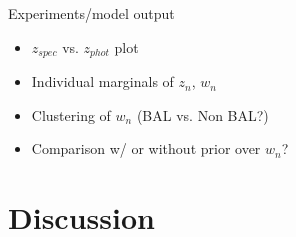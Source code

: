 \documentclass{article}
\begin{document}
Experiments/model output
\begin{itemize}
\item $z_{spec}$ vs. $z_{phot}$ plot 
\item Individual marginals of $z_n$, $w_n$
\item Clustering of $w_n$ (BAL vs. Non BAL?)
\item Comparison w/ or without prior over $w_n$?
\end{itemize}


\section{Discussion}



 






\end{document}
